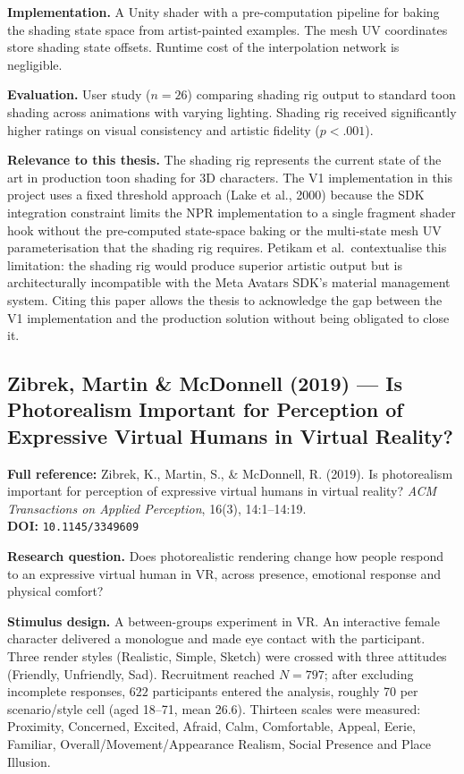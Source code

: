 \documentclass[11pt, a4paper]{article}
\begin{document}
\textbf{Implementation.} A Unity shader with a pre-computation pipeline for baking the shading state space from artist-painted examples. The mesh UV coordinates store shading state offsets. Runtime cost of the interpolation network is negligible.

\textbf{Evaluation.} User study ($n = 26$) comparing shading rig output to standard toon shading across animations with varying lighting. Shading rig received significantly higher ratings on visual consistency and artistic fidelity ($p < .001$).

\textbf{Relevance to this thesis.} The shading rig represents the current state of the art in production toon shading for 3D characters. The V1 implementation in this project uses a fixed threshold approach (Lake et al., 2000) because the SDK integration constraint limits the NPR implementation to a single fragment shader hook without the pre-computed state-space baking or the multi-state mesh UV parameterisation that the shading rig requires. Petikam et al.\ contextualise this limitation: the shading rig would produce superior artistic output but is architecturally incompatible with the Meta Avatars SDK's material management system. Citing this paper allows the thesis to acknowledge the gap between the V1 implementation and the production solution without being obligated to close it.

\vspace{8pt}
\subsection{Zibrek, Martin \& McDonnell (2019) --- Is Photorealism Important for Perception of Expressive Virtual Humans in Virtual Reality?}

\begin{refbox}
\textbf{Full reference:} Zibrek, K., Martin, S., \& McDonnell, R. (2019). Is photorealism important for perception of expressive virtual humans in virtual reality? \textit{ACM Transactions on Applied Perception}, 16(3), 14:1--14:19.\\[4pt]
\textbf{DOI:} \texttt{10.1145/3349609}
\end{refbox}

\textbf{Research question.} Does photorealistic rendering change how people respond to an expressive virtual human in VR, across presence, emotional response and physical comfort?

\textbf{Stimulus design.} A between-groups experiment in VR. An interactive female character delivered a monologue and made eye contact with the participant. Three render styles (Realistic, Simple, Sketch) were crossed with three attitudes (Friendly, Unfriendly, Sad). Recruitment reached $N = 797$; after excluding incomplete responses, $622$ participants entered the analysis, roughly 70 per scenario/style cell (aged 18--71, mean 26.6). Thirteen scales were measured: Proximity, Concerned, Excited, Afraid, Calm, Comfortable, Appeal, Eerie, Familiar, Overall/Movement/Appearance Realism, Social Presence and Place Illusion.
\end{document}
